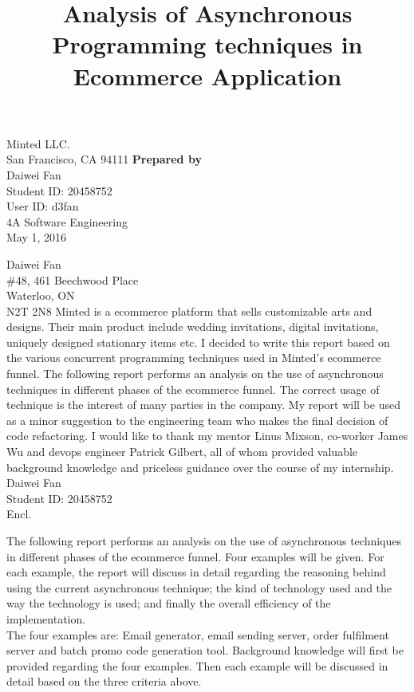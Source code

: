\documentclass[12pt]{article}
\begin{document}
\title{Analysis of Asynchronous Programming techniques in Ecommerce Application}
{
	Minted LLC.\\
	San Francisco, CA 94111
}
{
	\textbf{Prepared by}\\[2ex]
	
	Daiwei Fan\\
	Student ID: 20458752\\
	User ID: d3fan\\
	4A Software Engineering\\
	May 1, 2016
}


{
	\noindent
	Daiwei Fan\\
	\#48, 461 Beechwood Place\\
	Waterloo, ON\\
	N2T 2N8
}
{
	Minted is a ecommerce platform that sells customizable arts and designs. Their main product include wedding invitations, digital invitations, uniquely designed stationary items etc. I decided to write this report based on the various concurrent programming techniques used in Minted's ecommerce funnel.
}
{
	The following report performs an analysis on the use of asynchronous techniques in different phases of the ecommerce funnel. The correct usage of technique is the interest of many parties in the company. My report will be used as a minor suggestion to the engineering team who makes the final decision of code refactoring.
}
{
	I would like to thank my mentor Linus Mixson, co-worker James Wu and devops engineer Patrick Gilbert, all of whom provided valuable background knowledge and priceless guidance over the course of my internship.
}
{
	Daiwei Fan\\
	Student ID: 20458752\\[2ex]
	Encl.
}



The following report performs an analysis on the use of asynchronous techniques in different phases of the ecommerce funnel. Four examples will be given. For each example, the report will discuss in detail regarding the reasoning behind using the current asynchronous technique; the kind of technology used and the way the technology is used; and finally the overall efficiency of the implementation.\\

The four examples are: Email generator, email sending server, order fulfilment server and batch promo code generation tool. Background knowledge will first be provided regarding the four examples. Then each example will be discussed in detail based on the three criteria above.\\
\end{document}
